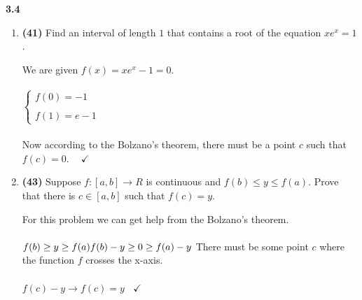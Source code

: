 \documentclass[fleqn]{article}
\begin{document}
  \textbf{3.4}
  \begin{enumerate}
    \item \textbf{(41)} Find an interval of length $1$ that contains a root of the equation $x e^x=1$.

      \textcolor{hwColor}{
        We are given $f(x)=x e^x-1=0$.
        \\
        \\
        $
          \begin{cases}
            f(0)=-1
            \\
            \\
            f(1)=e-1
          \end{cases}
        $
        \\
        \\
        Now according to the Bolzano’s theorem, there must be a point $c$ such that $f(c)=0$. $~~~~ \checkmark$
        \\
      }


    \item \textbf{(43)} Suppose $f: [a, b] \longrightarrow R$ is continuous and $f(b) \leq y \leq f(a)$. Prove that there is
    $c \in [a, b]$ such that $f(c)=y$.

      \textcolor{hwColor}{
        For this problem we can get help from the Bolzano’s theorem. 
        \\
        \\
        $
          f(b) \geq y \geq f(a)
          \\
          \\
          f(b)-y \geq 0 \geq f(a)-y
          \\
          \\
        $
        There must be some point $c$ where the function $f$ crosses the x-axis. 
        \\
        \\
        $
          f(c)-y \longrightarrow f(c)=y ~~~~ \checkmark
        $
        \\
      }
    
  \end{enumerate}
\end{document}
